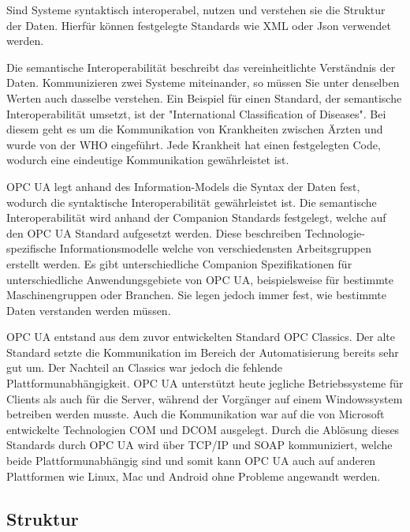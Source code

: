 \documentclass[a4paper, 12pt, oneside]{scrbook}
\begin{document}
	 Sind Systeme syntaktisch interoperabel, nutzen und verstehen sie die Struktur der Daten. Hierfür können festgelegte Standards wie XML oder Json verwendet werden. \cite{mielebacher_verteilte_2021-1}
	 
	 Die semantische Interoperabilität beschreibt das vereinheitlichte Verständnis der Daten. Kommunizieren zwei Systeme miteinander, so müssen Sie unter denselben Werten auch dasselbe verstehen. Ein Beispiel für einen Standard, der semantische Interoperabilität umsetzt, ist der "International Classification of Diseases". Bei diesem geht es um die Kommunikation von Krankheiten zwischen Ärzten und wurde von der WHO eingeführt. Jede Krankheit hat einen festgelegten Code, wodurch eine eindeutige Kommunikation gewährleistet ist. \cite{mielebacher_verteilte_2021-1}
	 
	 OPC UA legt anhand des Information-Models die Syntax der Daten fest, wodurch die syntaktische Interoperabilität gewährleistet ist. Die semantische Interoperabilität wird anhand der Companion Standards festgelegt, welche auf den OPC UA Standard aufgesetzt werden. Diese beschreiben Technologie-spezifische Informationsmodelle welche von verschiedensten Arbeitsgruppen erstellt werden. Es gibt unterschiedliche Companion Spezifikationen für unterschiedliche Anwendungsgebiete von OPC UA, beispielsweise für bestimmte Maschinengruppen oder Branchen. Sie legen jedoch immer fest, wie bestimmte Daten verstanden werden müssen. %
	 
	 OPC UA entstand aus dem zuvor entwickelten Standard OPC Classics. Der alte Standard setzte die Kommunikation im Bereich der Automatisierung bereits sehr gut um. Der Nachteil an Classics war jedoch die fehlende Plattformunabhängigkeit. OPC UA unterstützt heute jegliche Betriebssysteme für Clients als auch für die Server, während der Vorgänger auf einem Windowssystem betreiben werden musste. Auch die Kommunikation war auf die von Microsoft entwickelte Technologien \ac{COM} und \ac{DCOM} ausgelegt. Durch die Ablösung dieses Standards durch OPC UA wird über TCP/IP und SOAP kommuniziert, welche beide Plattformunabhängig sind und somit kann OPC UA auch auf anderen Plattformen wie Linux, Mac und Android ohne Probleme angewandt werden. \cite{mielebacher_verteilte_2021-1}
	
		\subsection{Struktur}
		
\end{document}
